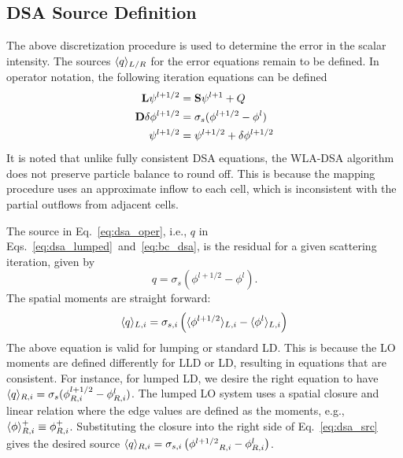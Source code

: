 \subsection{DSA Source Definition}

The above discretization procedure is used to determine the error in the scalar intensity.
The sources $\langle q \rangle_{L/R}$ for the error equations remain to be defined.  In operator
notation, the following
iteration equations can be defined
\begin{align}
    \mathbf{L} \psi^{l+1/2} &= \mathbf{S} \psi^{l+1} + Q \\
    \mathbf{D} \delta \phi^{l+1/2} &= \sigma_s (\phi^{l+1/2} - \phi^{l}) \label{eq:dsa_oper} \\
     \psi^{l+1/2} &= \mathbf{\psi}^{l+1/2} + \delta \mathbf{\phi}^{l+1/2}
\end{align}
It is noted that unlike fully consistent DSA equations, the WLA-DSA algorithm does not
preserve particle balance to round off.  This is because the mapping procedure uses an
approximate inflow to each cell, which is inconsistent with the partial outflows from
adjacent cells.

The source in Eq.~\eqref{eq:dsa_oper}, i.e., $q$ in
Eqs.~\eqref{eq:dsa_lumped}~and~\eqref{eq:bc_dsa}, is the residual for a given scattering iteration,
given by~\cite{morel_dsa,lewis}
\begin{equation}
    q = \sigma_s\left(\phi^{l+1/2} - \phi^{l}\right).
\end{equation}
The spatial moments are straight forward:
\begin{equation}\label{eq:dsa_src}
    \langle q \rangle_{L,i} = \sigma_{s,i}\left(\langle \phi^{l+1/2} \rangle_{L,i} -
    \langle \phi^{l} \rangle_{L,i}\right)
\end{equation}
The above equation is valid for lumping or standard LD.  This is because the LO
moments are defined differently for LLD or LD, resulting in equations that are
consistent.  For instance, for lumped LD, we desire the right equation to have $\langle q \rangle_{R,i} =
\sigma_s(\phi^{l+1/2}_{R,i} - \phi^{l}_{R,i})$.   The lumped LO system uses a spatial closure and
linear relation where the edge values are defined as the moments, e.g.,
$\langle \phi \rangle^+_{R,i} \equiv \phi^+_{R,i}$.
Substituting the closure into the right side of Eq.~\eqref{eq:dsa_src} gives the desired
source $\langle q \rangle_{R,i} = \sigma_{s,i}\left({\phi^{l+1/2}}_{R,i} -
    \phi^{l}_{R,i}\right) $. 

